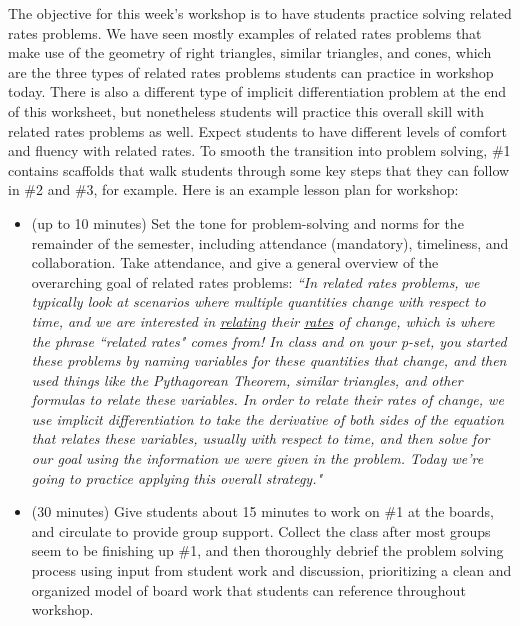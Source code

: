 \documentclass{article}
\begin{document}
\begin{workshop}
    The objective for this week's workshop is to have students practice solving related rates problems. We have seen mostly examples of related rates problems that make use of the geometry of right triangles, similar triangles, and cones, which are the three types of related rates problems students can practice in workshop today. There is also a different type of implicit differentiation problem at the end of this worksheet, but nonetheless students will practice this overall skill with related rates problems as well. Expect students to have different levels of comfort and fluency with related rates. To smooth the transition into problem solving, \#1 contains scaffolds that walk students through some key steps that they can follow in \#2 and \#3, for example. 
    \newline
    \newline
    Here is an example lesson plan for workshop:
    \begin{itemize}
        \item (up to 10 minutes) Set the tone for problem-solving and norms for the remainder of the semester, including attendance (mandatory), timeliness, and collaboration. Take attendance, and give a general overview of the overarching goal of related rates problems: \textit{``In related rates problems, we typically look at scenarios where multiple quantities change with respect to time, and we are interested in \underline{relating} their \underline{rates} of change, which is where the phrase ``related rates" comes from! In class and on your p-set, you started these problems by naming variables for these quantities that change, and then used things like the Pythagorean Theorem, similar triangles, and other formulas to relate these variables. In order to relate their \textit{rates of change}, we use implicit differentiation to take the derivative of both sides of the equation that relates these variables, usually with respect to time, and then solve for our goal using the information we were given in the problem. Today we're going to practice applying this overall strategy."}
        \item (30 minutes) Give students about 15 minutes to work on \#1 at the boards, and circulate to provide group support. Collect the class after most groups seem to be finishing up \#1, and then thoroughly debrief the problem solving process using input from student work and discussion, prioritizing a clean and organized model of board work that students can reference throughout workshop.

\end{itemize}
\end{workshop}
\end{document}
